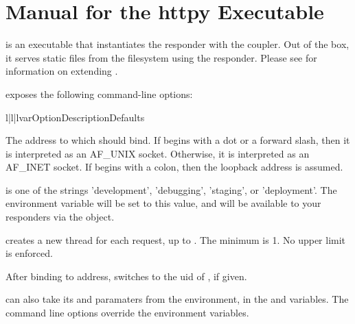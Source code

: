\chapter{Manual for the httpy Executable \label{manual}}

 is an executable that instantiates the 
responder with the  coupler. Out of the box, it serves static
files from the filesystem using the  responder. Please see
 for information on
extending .

 exposes the following command-line options:


\begin{tableiii}{l|l|l}{var}{Option}{Description}{Defaults}

    {The address to which  should bind. If  begins
    with a dot or a forward slash, then it is interpreted as an AF_UNIX socket.
    Otherwise, it is interpreted as an AF_INET socket. If  begins
    with a colon, then the loopback address is assumed.} {}

    { is one of the strings 'development', 'debugging', 'staging', or
    'deployment'.  The  environment variable will be set to
    this value, and will be available to your responders via the
     object.} {}

    { creates a new thread for each request, up to .
    The minimum is 1. No upper limit is enforced.}
    {}

    {After binding to address,  switches to the uid of
    , if given.}
    {}

\end{tableiii}


 can also take its  and  paramaters from
the environment, in the  and 
variables. The command line options override the environment variables.
